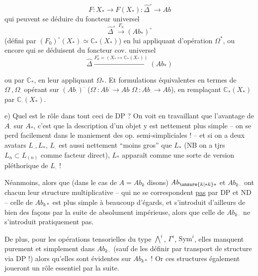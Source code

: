 
\[
F:X_{\ast}\longrightarrow F(X_{\ast}):\widehat\Delta^{\circ}\longrightarrow\mathit{Ab}
\]
qui peuvent se déduire du foncteur
universel
\[
\widehat\Delta^{\circ}\xrightarrow{F_0}(\mathit{Ab}_{\ast})^{\circ}
\]
(défini par $(F_0)^{\circ}(X_{\ast})\simeq\mathbb C_{\ast}(X_{\ast})$)
en lui appliquant d'opération $\Omega^{\ast}$,
ou encore qui se déduisent du
foncteur cov. universel
\[
\widehat\Delta\xrightarrow{F_0^{\circ}=(X_{\ast}\mapsto\mathbb C_{\ast}(X_{\ast}))}(\mathit{Ab}_{\ast})
\]

 ou  par $\mathbb C_{\ast}$, en leur
appliquant  $\Omega_{\ast}$. Et   formulations
équivalentes en termes de $\Omega^{\cdot},\Omega_{\cdot}$
opérant sur $(\mathit{Ab}_{\cdot})^{\cdot}$ ($\Omega^{\cdot}:\mathit{Ab}^{\cdot}\longrightarrow\mathit{Ab}$
$\Omega_{\cdot}:\mathit{Ab}_{\cdot}\longrightarrow\mathit{Ab}$), en remplaçant
$\mathbb C_{\ast}(X_{\ast})$ par $\mathbb C_{\cdot}(X_{\ast})$.

e) Quel est le rôle dans tout ceci de DP ?
On voit en travaillant que l'avantage
de $A_{\cdot}$ sur $A_{\ast}$, c'est que la description
d'un objet y est nettement plus simple
-- on se perd facilement dans le
maniement des op. semi-simpliciales ! --
et si on a deux avatars $L_{\cdot},L_{\ast}$,
$L_{\cdot}$ est aussi nettement ``moins gros''
que $L_{\ast}$ (NB on a tjrs $L_n\subset L_{(n)}$ comme
facteur direct), $L_{\ast}$ apparaît comme
une sorte de version pléthorique de $L_{\cdot}$ !

Néanmoins, alors que (dans le cas de
$A=\mathit{Ab}_{k}$ disons) $\mathit{Ab}_{\unsure{k|{\ast}k}\ast}$ et $\mathit{Ab}_{k\cdot}$ ont chacun
leur structure multiplicative -- qui
ne se correspondent \uline{pas} par DP et ND --
celle de $\mathit{Ab}_{k\ast}$ est plus simple à beaucoup
d'égards, et s'introduit d'ailleurs de
bien des façons par la suite de 
absolument impérieuse, alors que celle
de $\mathit{Ab}_{k\cdot}$ ne s'introduit pratiquement pas.

De plus, pour les opérations tensorielles
du type $\bigwedge^{i}$, $\Gamma^{i}$, $\mathrm{Sym}^{i}$, elles manquent
purement et simplement dans $\mathit{Ab}_{k\cdot}$
(sauf de les définir par transport de
structure via DP !) alors qu'elles sont
évidentes  sur $\mathit{Ab}_{k\ast}$ ! Or ces
structures également joueront un rôle
essentiel par la suite.
